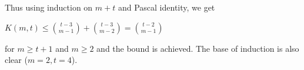 \documentclass[12pt, reqno]{amsart}
\theoremstyle{definition}
\newtheorem{observation}[theorem]{Observation}
\theoremstyle{remark}
\numberwithin{equation}{section}
\begin{document}
  	
  	
  	 Thus using induction on $m+t$ and Pascal identity, we get
  	 
  	 \begin{center}
  	 	
  	 $K(m,t)\leq \binom{t-3}{m-1}+ \binom{t-3}{m-2}=\binom{t-2}{m-1}$
  	
  	\end{center}

   for 
   $m\geq t+1$ and $m\geq 2$ and the bound is achieved. The base of induction is also clear ($m=2,t=4$).
   
   	
   
   
   
   
   
  
  
  
  
\end{document}
